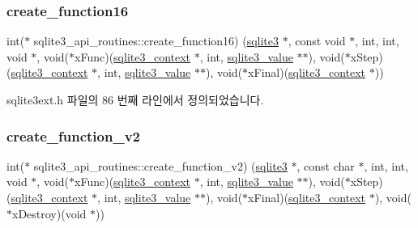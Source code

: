 \subsubsection{\texorpdfstring{create\+\_\+function16}{create\_function16}}
{\footnotesize\ttfamily int($\ast$ sqlite3\+\_\+api\+\_\+routines\+::create\+\_\+function16) (\hyperlink{sqlite3_8h_a0ef6f2646262c8a9b24368d8ac140f69}{sqlite3} $\ast$, const void $\ast$, int, int, void $\ast$, void($\ast$x\+Func)(\hyperlink{sqlite3_8h_a3b519553ffec8fc42b2356f5b1ebdc57}{sqlite3\+\_\+context} $\ast$, int, \hyperlink{sqlite3_8h_ac2fa1ecdb2290d9af6010edbd1cbc83c}{sqlite3\+\_\+value} $\ast$$\ast$), void($\ast$x\+Step)(\hyperlink{sqlite3_8h_a3b519553ffec8fc42b2356f5b1ebdc57}{sqlite3\+\_\+context} $\ast$, int, \hyperlink{sqlite3_8h_ac2fa1ecdb2290d9af6010edbd1cbc83c}{sqlite3\+\_\+value} $\ast$$\ast$), void($\ast$x\+Final)(\hyperlink{sqlite3_8h_a3b519553ffec8fc42b2356f5b1ebdc57}{sqlite3\+\_\+context} $\ast$))}



sqlite3ext.\+h 파일의 86 번째 라인에서 정의되었습니다.

\mbox{\label{structsqlite3__api__routines_aaaefe1980584ef9d0c6d22503d68e926}} 
\subsubsection{\texorpdfstring{create\+\_\+function\+\_\+v2}{create\_function\_v2}}
{\footnotesize\ttfamily int($\ast$ sqlite3\+\_\+api\+\_\+routines\+::create\+\_\+function\+\_\+v2) (\hyperlink{sqlite3_8h_a0ef6f2646262c8a9b24368d8ac140f69}{sqlite3} $\ast$, const char $\ast$, int, int, void $\ast$, void($\ast$x\+Func)(\hyperlink{sqlite3_8h_a3b519553ffec8fc42b2356f5b1ebdc57}{sqlite3\+\_\+context} $\ast$, int, \hyperlink{sqlite3_8h_ac2fa1ecdb2290d9af6010edbd1cbc83c}{sqlite3\+\_\+value} $\ast$$\ast$), void($\ast$x\+Step)(\hyperlink{sqlite3_8h_a3b519553ffec8fc42b2356f5b1ebdc57}{sqlite3\+\_\+context} $\ast$, int, \hyperlink{sqlite3_8h_ac2fa1ecdb2290d9af6010edbd1cbc83c}{sqlite3\+\_\+value} $\ast$$\ast$), void($\ast$x\+Final)(\hyperlink{sqlite3_8h_a3b519553ffec8fc42b2356f5b1ebdc57}{sqlite3\+\_\+context} $\ast$), void($\ast$x\+Destroy)(void $\ast$))}



